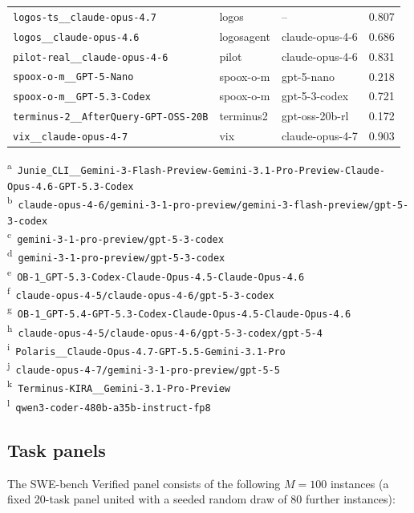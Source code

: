 \documentclass{article}
\begin{document}
\begin{center}
\begin{longtable}{lllc}
\texttt{logos-ts\_\_claude-opus-4.7} & logos & -- & 0.807 \\
\texttt{logos\_\_claude-opus-4.6} & logosagent & claude-opus-4-6 & 0.686 \\
\texttt{pilot-real\_\_claude-opus-4-6} & pilot & claude-opus-4-6 & 0.831 \\
\texttt{spoox-o-m\_\_GPT-5-Nano} & spoox-o-m & gpt-5-nano & 0.218 \\
\texttt{spoox-o-m\_\_GPT-5.3-Codex} & spoox-o-m & gpt-5-3-codex & 0.721 \\
\texttt{terminus-2\_\_AfterQuery-GPT-OSS-20B} & terminus2 & gpt-oss-20b-rl & 0.172 \\
\texttt{vix\_\_claude-opus-4-7} & vix & claude-opus-4-7 & 0.903 \\
\end{longtable}
\end{center}

{\scriptsize\noindent \textsuperscript{a}~\texttt{Junie\_CLI\_\_Gemini-3-Flash-Preview-Gemini-3.1-Pro-Preview-Claude-Opus-4.6-GPT-5.3-Codex} \\
\textsuperscript{b}~\texttt{claude-opus-4-6/gemini-3-1-pro-preview/gemini-3-flash-preview/gpt-5-3-codex} \\
\textsuperscript{c}~\texttt{gemini-3-1-pro-preview/gpt-5-3-codex} \\
\textsuperscript{d}~\texttt{gemini-3-1-pro-preview/gpt-5-3-codex} \\
\textsuperscript{e}~\texttt{OB-1\_GPT-5.3-Codex-Claude-Opus-4.5-Claude-Opus-4.6} \\
\textsuperscript{f}~\texttt{claude-opus-4-5/claude-opus-4-6/gpt-5-3-codex} \\
\textsuperscript{g}~\texttt{OB-1\_GPT-5.4-GPT-5.3-Codex-Claude-Opus-4.5-Claude-Opus-4.6} \\
\textsuperscript{h}~\texttt{claude-opus-4-5/claude-opus-4-6/gpt-5-3-codex/gpt-5-4} \\
\textsuperscript{i}~\texttt{Polaris\_\_Claude-Opus-4.7-GPT-5.5-Gemini-3.1-Pro} \\
\textsuperscript{j}~\texttt{claude-opus-4-7/gemini-3-1-pro-preview/gpt-5-5} \\
\textsuperscript{k}~\texttt{Terminus-KIRA\_\_Gemini-3.1-Pro-Preview} \\
\textsuperscript{l}~\texttt{qwen3-coder-480b-a35b-instruct-fp8}}

\subsection{Task panels}
The SWE-bench Verified panel consists of the following $M = 100$ instances (a fixed 20-task panel united with a seeded random draw of 80 further instances):
\end{document}
